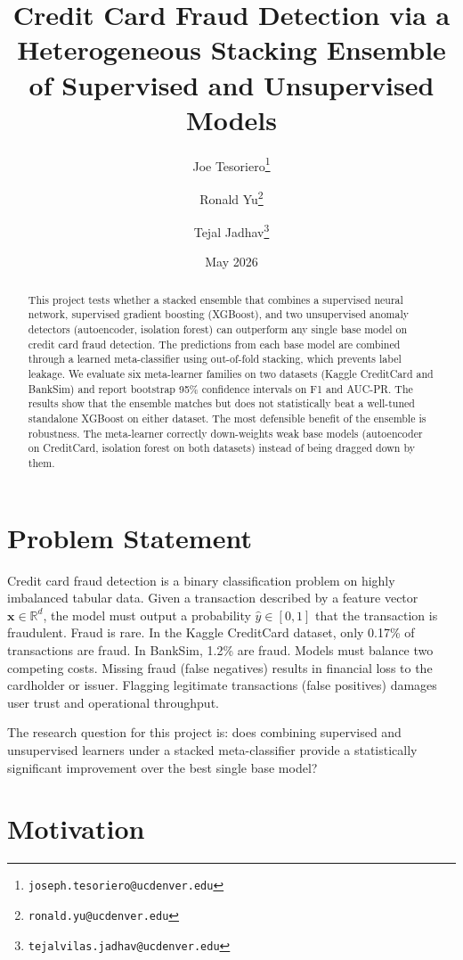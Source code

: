 \documentclass[11pt]{article}
\title{Credit Card Fraud Detection via a Heterogeneous Stacking Ensemble of Supervised and Unsupervised Models}
\author[1]{Joe Tesoriero\thanks{\texttt{joseph.tesoriero@ucdenver.edu}}}
\author[1]{Ronald Yu\thanks{\texttt{ronald.yu@ucdenver.edu}}}
\author[1]{Tejal Jadhav\thanks{\texttt{tejalvilas.jadhav@ucdenver.edu}}}
\affil[1]{Department of Computer Science and Engineering, University of Colorado Denver \\ CSCI-5931: Deep Learning}
\date{May 2026}
\begin{document}
\maketitle

\begin{abstract}
This project tests whether a stacked ensemble that combines a supervised neural network, supervised gradient boosting (XGBoost), and two unsupervised anomaly detectors (autoencoder, isolation forest) can outperform any single base model on credit card fraud detection. The predictions from each base model are combined through a learned meta-classifier using out-of-fold stacking, which prevents label leakage. We evaluate six meta-learner families on two datasets (Kaggle CreditCard and BankSim) and report bootstrap 95\% confidence intervals on F1 and AUC-PR. The results show that the ensemble matches but does not statistically beat a well-tuned standalone XGBoost on either dataset. The most defensible benefit of the ensemble is robustness. The meta-learner correctly down-weights weak base models (autoencoder on CreditCard, isolation forest on both datasets) instead of being dragged down by them.
\end{abstract}

\section{Problem Statement}

Credit card fraud detection is a binary classification problem on highly imbalanced tabular data. Given a transaction described by a feature vector $\mathbf{x} \in \mathbb{R}^d$, the model must output a probability $\hat{y} \in [0,1]$ that the transaction is fraudulent. Fraud is rare. In the Kaggle CreditCard dataset, only 0.17\% of transactions are fraud. In BankSim, 1.2\% are fraud. Models must balance two competing costs. Missing fraud (false negatives) results in financial loss to the cardholder or issuer. Flagging legitimate transactions (false positives) damages user trust and operational throughput.

The research question for this project is: does combining supervised and unsupervised learners under a stacked meta-classifier provide a statistically significant improvement over the best single base model?

\section{Motivation}
\end{document}
